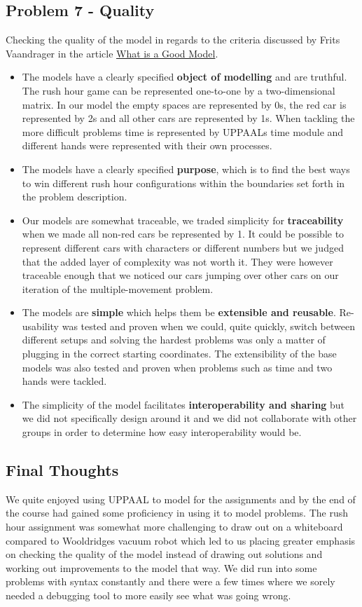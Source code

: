 \documentclass{article}
\begin{document}
\subsection{Problem 7 - Quality}
Checking the quality of the model in regards to the criteria discussed by Frits Vaandrager in the article \href{https://www.cs.ru.nl/F.Vaandrager/PV/what_is_a_good_model.html}{What is a Good Model}.
\begin{itemize}
    \item The models have a clearly specified \textbf{object of modelling} and are truthful. The rush hour game can be represented one-to-one by a two-dimensional matrix. In our model the empty spaces are represented by 0s, the red car is represented by 2s and all other cars are represented by 1s. When tackling the more difficult problems time is represented by UPPAALs time module and different hands were represented with their own processes.
    \item The models have a clearly specified \textbf{purpose}, which is to find the best ways to win different rush hour configurations within the boundaries set forth in the problem description.
    \item Our models are somewhat traceable, we traded simplicity for \textbf{traceability} when we made all non-red cars be represented by 1. It could be possible to represent different cars with characters or different numbers but we judged that the added layer of complexity was not worth it. They were however traceable enough that we noticed our cars jumping over other cars on our iteration of the multiple-movement problem.
    \item The models are \textbf{simple} which helps them be \textbf{extensible and reusable}. Re-usability was tested and proven when we could, quite quickly, switch between different setups and solving the hardest problems was only a matter of plugging in the correct starting coordinates. The extensibility of the base models was also tested and proven when problems such as time and two hands were tackled.
    \item The simplicity of the model facilitates \textbf{interoperability and sharing} but we did not specifically design around it and we did not collaborate with other groups in order to determine how easy interoperability would be.
\end{itemize}

\subsection{Final Thoughts}
We quite enjoyed using UPPAAL to model for the assignments and by the end of the course had gained some proficiency in using it to model problems. The rush hour assignment was somewhat more challenging to draw out on a whiteboard compared to Wooldridges vacuum robot which led to us placing greater emphasis on checking the quality of the model instead of drawing out solutions and working out improvements to the model that way. We did run into some problems with syntax constantly and there were a few times where we sorely needed a debugging tool to more easily see what was going wrong.
\end{document}
